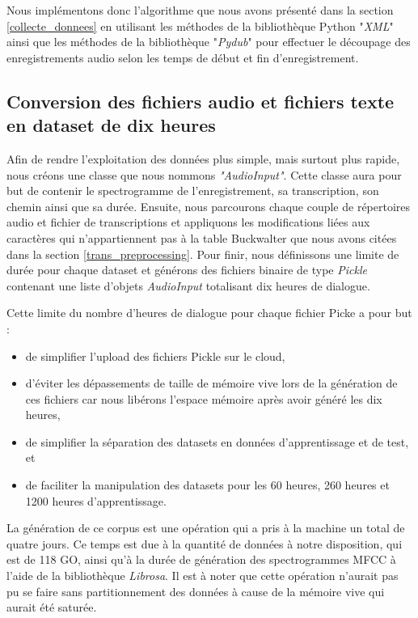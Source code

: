 Nous implémentons donc l'algorithme que nous avons présenté dans la section \ref{collecte_donnees} en utilisant les méthodes de la bibliothèque Python "\textit{XML}" ainsi que les méthodes de la bibliothèque "\textit{Pydub}" pour effectuer le découpage des enregistrements audio selon les temps de début et fin d'enregistrement. 

 
\subsection{Conversion des fichiers audio et fichiers texte en dataset de dix heures}
Afin de rendre l'exploitation des données plus simple, mais surtout plus rapide, nous créons une classe que nous nommons \textit{"AudioInput"}. Cette classe aura pour but de contenir le spectrogramme de l'enregistrement, sa transcription, son chemin ainsi que sa durée. Ensuite, nous parcourons chaque couple de répertoires audio et fichier de transcriptions et appliquons les modifications liées aux caractères qui n'appartiennent pas à la table Buckwalter \cite{buckwalter} que nous avons citées dans la section \ref{trans_preprocessing}. Pour finir, nous définissons une limite de durée pour chaque dataset et générons des fichiers binaire de type \textit{Pickle} contenant une liste d'objets \textit{AudioInput} totalisant dix heures de dialogue.

Cette limite du nombre d'heures de dialogue pour chaque fichier Picke a pour but :
\begin{itemize}
    \item de simplifier l'upload des fichiers Pickle sur le cloud,
    \item d'éviter les dépassements de taille de mémoire vive lors de la génération de ces fichiers car nous libérons l'espace mémoire après avoir généré les dix heures,  
    \item de simplifier la séparation des datasets en données d'apprentissage et de test, et
    \item de faciliter la manipulation des datasets pour les 60 heures, 260 heures et 1200 heures d'apprentissage. \\
\end{itemize}

La génération de ce corpus est une opération qui a pris à la machine un total de quatre jours. Ce temps est due à la quantité de données à notre disposition, qui est de 118 GO, ainsi qu'à la durée de génération des spectrogrammes MFCC à l'aide de la bibliothèque \textit{Librosa}. Il est à noter que cette opération n'aurait pas pu se faire sans partitionnement des données à cause de la mémoire vive qui aurait été saturée. 

